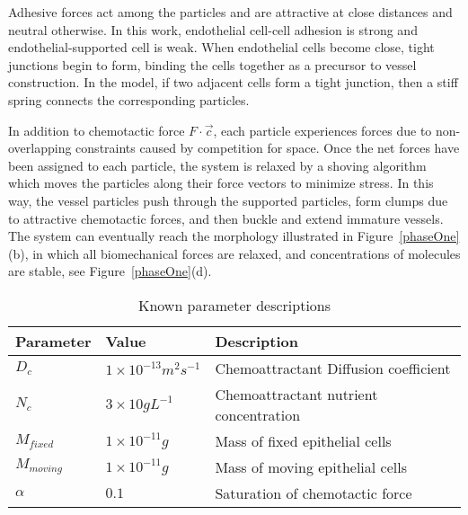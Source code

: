 Adhesive forces act among the particles and are attractive at close distances and neutral otherwise. In this work, endothelial cell-cell adhesion is strong and endothelial-supported cell is weak. When endothelial cells become close, tight junctions begin to form, binding the cells together as a precursor to vessel construction. In the model, if two adjacent cells form a tight junction, then a stiff spring connects the corresponding particles.

In addition to chemotactic force $F \cdot \vec{c}$, each particle experiences forces due to non-overlapping constraints caused by competition for space. Once the net forces have been assigned to each particle, the system is relaxed by a shoving algorithm which moves the particles along their force vectors to minimize stress. In this way, the vessel particles push through the supported particles, form clumps due to attractive chemotactic forces, and then buckle and extend immature vessels. The system can eventually reach the morphology illustrated in Figure~\ref{phaseOne}(b), in which all biomechanical forces are relaxed, and concentrations of molecules are stable, see Figure~\ref{phaseOne}(d).

\begin{table}[ht]
\caption{Known parameter descriptions} %
\centering
\begin{footnotesize}
\begin{tabular}{l l l}
\hline
Parameter   &  Value & Description\\ \hline \hline
$D_{c}$     & $1 \times 10^{-13} m^{2} s^{-1}$ & Chemoattractant Diffusion coefficient \\%
$N_{c}$     & $3 \times 10 g L^{-1}$ & Chemoattractant nutrient concentration \\%
$M_{fixed}$  & $1 \times 10^{-11} g$ & Mass of fixed epithelial cells \\%
$M_{moving}$  & $1 \times 10^{-11} g$ & Mass of moving epithelial cells \\%
$\alpha $     &  $0.1$           & Saturation of chemotactic force\\
[1ex]      %

\hline
\end{tabular}
\end{footnotesize}
\label{parameters}
\end{table}
